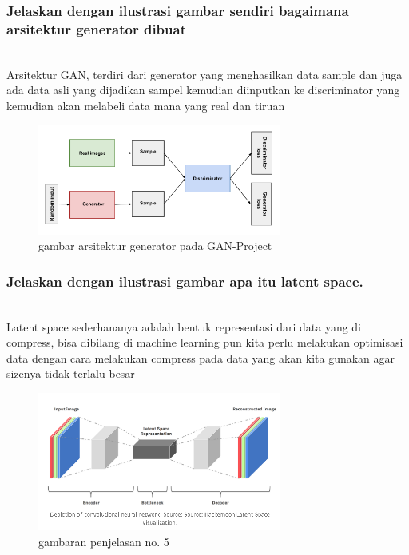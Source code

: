 \subsubsection{Jelaskan dengan ilustrasi gambar sendiri bagaimana arsitektur generator dibuat}
\hfill\\
Arsitektur GAN, terdiri dari generator yang menghasilkan data sample dan juga ada data asli yang dijadikan sampel kemudian diinputkan ke discriminator yang kemudian akan melabeli data mana yang real dan tiruan
\begin{figure}[H]
	\centering
	\includegraphics[width=8cm]{figures/1174079/8/arsitektur_GAN.png}
	\caption{gambar arsitektur generator pada GAN-Project}
\end{figure}

\subsubsection{Jelaskan dengan ilustrasi gambar apa itu latent space.}
\hfill\\
Latent space sederhananya adalah bentuk representasi dari data yang di compress, bisa dibilang di machine learning pun kita perlu melakukan optimisasi data dengan cara melakukan compress pada data yang akan kita gunakan agar sizenya tidak terlalu besar
\begin{figure}[H]
	\centering
	\includegraphics[width=8cm]{figures/1174079/8/latentspace.png}
	\caption{gambaran penjelasan no. 5}
\end{figure}

